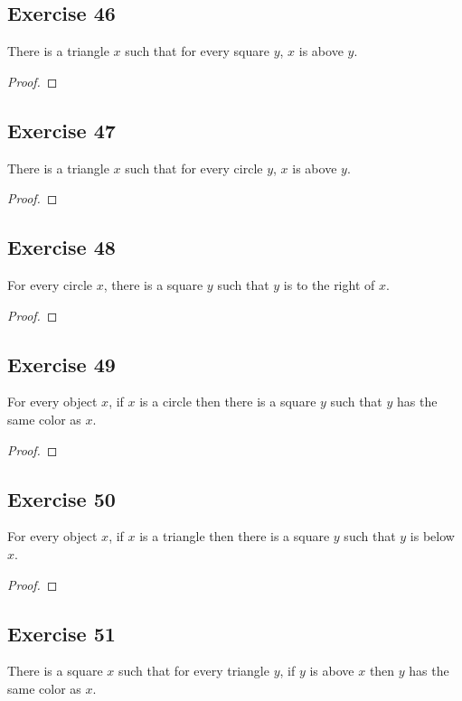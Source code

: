 \documentclass[14pt]{extarticle}
\begin{document}
\subsection{Exercise 46}
There is a triangle $x$ such that for every square $y$, $x$ is above $y$.

\begin{proof}

\end{proof}

\subsection{Exercise 47}
There is a triangle $x$ such that for every circle $y$, $x$ is above $y$.

\begin{proof}

\end{proof}

\subsection{Exercise 48}
For every circle $x$, there is a square $y$ such that $y$ is to the right of $x$.

\begin{proof}

\end{proof}

\subsection{Exercise 49}
For every object $x$, if $x$ is a circle then there is a square $y$ such that $y$ has the same color as $x$.

\begin{proof}

\end{proof}

\subsection{Exercise 50}
For every object $x$, if $x$ is a triangle then there is a square $y$ such that $y$ is below $x$.

\begin{proof}

\end{proof}

\subsection{Exercise 51}
There is a square $x$ such that for every triangle $y$, if $y$ is above $x$ then $y$ has the same color as $x$.
\end{document}
